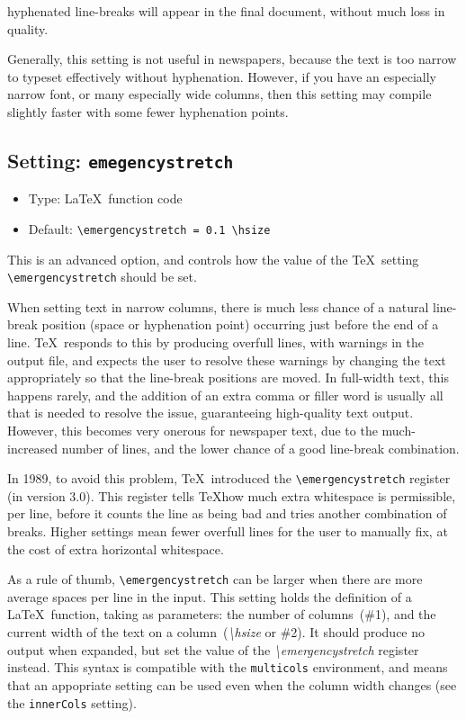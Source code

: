 \documentclass[a4paper,DIV=11]{scrartcl}
\newcommand{\property}[5]{
  \subsection{#1: \texttt{#2}}
  \begin{itemize}
  \item Type: #3
  \item Default: #4
  \end{itemize}
  #5
}
\newcommand{\setting}{\property{Setting}}
\begin{document}
\begin{multicols}{2}
{  hyphenated line-breaks will appear in the final document, without
  much loss in quality.\par
  Generally, this setting is not useful in newspapers, because the
  text is too narrow to typeset effectively without
  hyphenation. However, if you have an especially narrow font, or many
  especially wide columns, then this setting may compile slightly
  faster with some fewer hyphenation points.
}
\setting{emegencystretch}{\LaTeX\ function code}{\texttt{\textbackslash emergencystretch = 0.1 \textbackslash hsize}}{
  This is an advanced option, and controls how the value of the \TeX\ setting
  \texttt{\textbackslash emergencystretch} should be set.\par
  When setting text in narrow columns, there is much less chance of a
  natural line-break position (space or hyphenation point) occurring
  just before the end of a line. \TeX\ responds to this by producing
  overfull lines, with warnings in the output file, and expects the
  user to resolve these warnings by changing the text appropriately so
  that the line-break positions are moved. In full-width text, this
  happens rarely, and the addition of an extra comma or filler word is
  usually all that is needed to resolve the issue, guaranteeing
  high-quality text output. However, this
  becomes very onerous for newspaper text, due to the much-increased
  number of lines, and the lower chance of a good line-break
  combination.\par
  In 1989, to avoid this problem, \TeX\ introduced the
  \texttt{\textbackslash emergencystretch}
  register (in version 3.0). This register tells \TeX how much extra
  whitespace is permissible, per line, before it counts the line as
  being bad and tries another combination of breaks. Higher settings
  mean fewer overfull lines for the user to manually fix, at the cost
  of extra horizontal whitespace.\par
  As a rule of thumb, \texttt{\textbackslash emergencystretch} can be
  larger when there are more average spaces per line in the input.
  This setting holds the definition of a \LaTeX\ function, taking as
  parameters: the number of columns~(\#1), and the current width of
  the text on a column~(\textit{\textbackslash hsize} or \#2). It
  should produce no output when expanded, but set the value of the
  \textit{\textbackslash emergencystretch} register instead. This
  syntax is compatible with the \texttt{multicols} environment, and
  means that an appopriate setting can be used even when the column
  width changes (see the \texttt{innerCols} setting).\par
}
\end{multicols}
\end{document}
